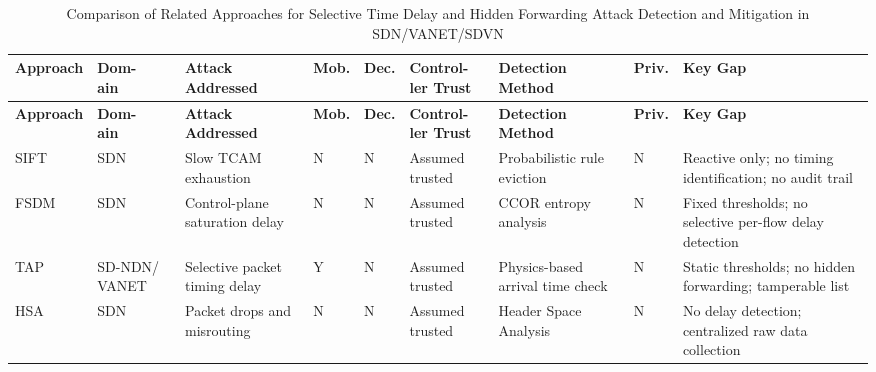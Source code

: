 \documentclass[12pt, a4paper]{report}
\begin{document}
\begin{longtable}{
|>{\raggedright\arraybackslash}p{1.53cm}
|>{\centering\arraybackslash}p{1.04cm}
|>{\raggedright\arraybackslash}p{2.1cm}
|>{\centering\arraybackslash}p{0.55cm}
|>{\centering\arraybackslash}p{0.55cm}
|>{\raggedright\arraybackslash}p{1.4cm}
|>{\raggedright\arraybackslash}p{2.3cm}
|>{\centering\arraybackslash}p{0.55cm}
|>{\raggedright\arraybackslash}p{2.6cm}|}


\caption{Comparison of Related Approaches for Selective Time Delay 
and Hidden Forwarding Attack Detection and Mitigation in SDN/VANET/SDVN}
\label{tab:lit_comparison} \\

\hline
\textbf{Approach} & \makecell{\textbf{Dom-}\\\textbf{ain}} & \textbf{Attack Addressed} & 
\textbf{Mob.} & \textbf{Dec.} & \makecell{\textbf{Control-}\\\textbf{ler Trust}}  & 
\textbf{Detection Method} & \textbf{Priv.} & \textbf{Key Gap} \\
\hline
\endfirsthead

\hline
\textbf{Approach} & \makecell{\textbf{Dom-}\\\textbf{ain}} & \textbf{Attack Addressed} & 
\textbf{Mob.} & \textbf{Dec.} & \makecell{\textbf{Control-}\\\textbf{ler Trust}}  & 
\textbf{Detection Method} & \textbf{Priv.} & \textbf{Key Gap} \\
\hline
\endhead

SIFT~\cite{Pascoal2017} 
& SDN 
& Slow TCAM exhaustion 
& N & N 
& Assumed trusted 
& Probabilistic rule eviction 
& N 
& Reactive only; no timing identification; no audit trail \\
\hline

FSDM~\cite{Huang2020} 
& SDN 
& Control-plane saturation delay 
& N & N 
& Assumed trusted 
& CCOR entropy analysis 
& N 
& Fixed thresholds; no selective per-flow delay detection \\
\hline

TAP~\cite{Arsalan2018} 
& SD-NDN/ VANET 
& Selective packet timing delay 
& Y & N 
& Assumed trusted 
& Physics-based arrival time check 
& N 
& Static thresholds; no hidden forwarding; tamperable list \\
\hline

HSA~\cite{Mohammadi2016} 
& SDN 
& Packet drops and misrouting 
& N & N 
& Assumed trusted 
& Header Space Analysis 
& N 
& No delay detection; centralized raw data collection \\
\hline


\end{longtable}
\end{document}
